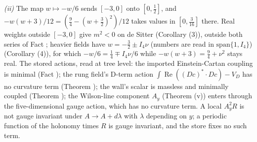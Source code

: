 \emph{(ii)} The map $w \mapsto -w/6$ sends $[-3, 0]$ onto $[0, \tfrac12]$, and $-w(w + 3)/12 = (\tfrac94 - (w + \tfrac32)^{2})/12$ takes values in $[0, \tfrac{3}{16}]$ there. Real weights outside $[-3, 0]$ give $m^{2} < 0$ on de Sitter (Corollary (3)), outside both series of Fact ; heavier fields have $w = -\tfrac32 \pm I_4\nu$ (numbers are read in $\mathrm{span}\{1, I_4\}$) (Corollary (4)), for which $-w/6 = \tfrac14 \mp I_4\nu/6$ while $-w(w + 3) = \tfrac94 + \nu^{2}$ stays real. The stored actions, read at tree level: the imported Einstein-Cartan coupling is minimal (Fact ); the rung field's D-term action $\int \operatorname{Re}((Dc)^{*}\cdot Dc) - V_{D}$ has no curvature term (Theorem ); the wall's scalar is massless and minimally coupled (Theorem ); the Wilson-line component $A_{y}$ (Theorem (v)) enters through the five-dimensional gauge action, which has no curvature term. A local $A_{y}^{2}R$ is not gauge invariant under $A \to A + d\lambda$ with $\lambda$ depending on $y$; a periodic function of the holonomy times $R$ is gauge invariant, and the store fixes no such term.

